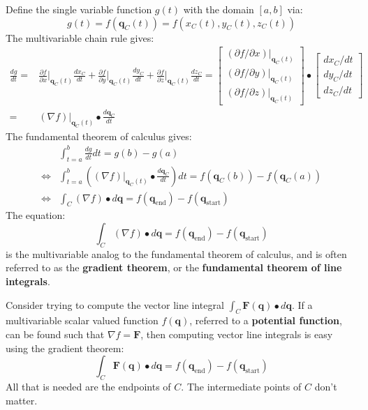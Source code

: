 \documentclass{article}
\begin{document}
Define the single variable function \(g(t)\) with the domain \([a, b]\) via:
\[g(t) = f(\mathbf{q}_C(t)) = f(x_C(t), y_C(t), z_C(t))\]
The multivariable chain rule gives: 
\begin{align*}
\frac{dg}{dt} 
= & \frac{\partial f}{\partial x}\bigg|_{\mathbf{q}_C(t)}\frac{dx_C}{dt} + \frac{\partial f}{\partial y}\bigg|_{\mathbf{q}_C(t)}\frac{dy_C}{dt} + \frac{\partial f}{\partial z}\bigg|_{\mathbf{q}_C(t)}\frac{dz_C}{dt}
= \begin{bmatrix} (\partial f/\partial x)|_{\mathbf{q}_C(t)} \\ (\partial f/\partial y)|_{\mathbf{q}_C(t)} \\ (\partial f/\partial z)|_{\mathbf{q}_C(t)} \end{bmatrix} \bullet \begin{bmatrix} dx_C/dt \\ dy_C/dt \\ dz_C/dt \end{bmatrix} \\
= & (\nabla f)\bigg|_{\mathbf{q}_C(t)} \bullet \frac{d\mathbf{q}_C}{dt}
\end{align*}
The fundamental theorem of calculus gives: 
\begin{align*}
& \int_{t = a}^b \frac{dg}{dt}dt = g(b) - g(a) \\
\iff & \int_{t = a}^b \left((\nabla f)\bigg|_{\mathbf{q}_C(t)} \bullet \frac{d\mathbf{q}_C}{dt}\right)dt = f(\mathbf{q}_C(b)) - f(\mathbf{q}_C(a)) \\ 
\iff & \int_C (\nabla f) \bullet d\mathbf{q} = f(\mathbf{q}_{\text{end}}) - f(\mathbf{q}_{\text{start}})
\end{align*}
The equation: 
\[\int_C (\nabla f) \bullet d\mathbf{q} = f(\mathbf{q}_{\text{end}}) - f(\mathbf{q}_{\text{start}})\]
is the multivariable analog to the fundamental theorem of calculus, and is often referred to as the {\bf gradient theorem}, or the {\bf fundamental theorem of line integrals}. 

Consider trying to compute the vector line integral \(\int_C \mathbf{F}(\mathbf{q}) \bullet d\mathbf{q}\). If a multivariable scalar valued function \(f(\mathbf{q})\), referred to a {\bf potential function}, can be found such that \(\nabla f = \mathbf{F}\), then computing vector line integrals is easy using the gradient theorem:
\[\int_C \mathbf{F}(\mathbf{q}) \bullet d\mathbf{q} = f(\mathbf{q}_{\text{end}}) - f(\mathbf{q}_{\text{start}})\]
All that is needed are the endpoints of \(C\). The intermediate points of \(C\) don't matter. 
\end{document}
